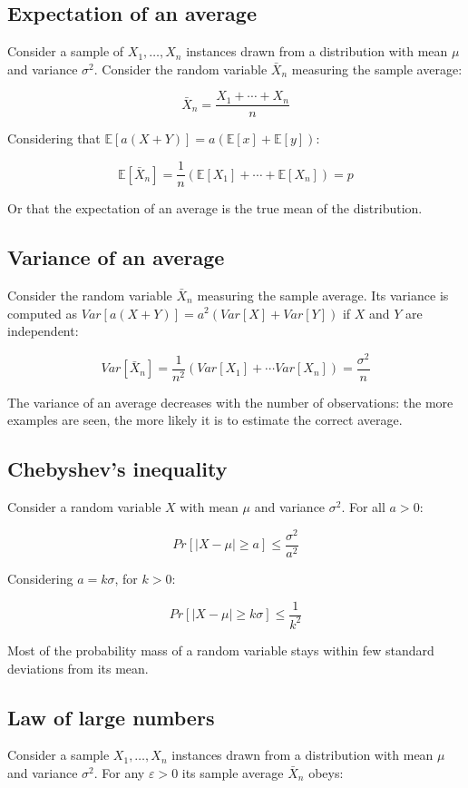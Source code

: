 	\subsection{Expectation of an average}
	Consider a sample of $X_1, \dots, X_n$ instances drawn from a distribution with mean $\mu$ and variance $\sigma^2$.
	Consider the random variable $\bar{X}_n$ measuring the sample average:

	$$\bar{X}_n = \frac{X_1+\cdots+X_n}{n}$$

	Considering that $\mathbb{E}[a(X+Y)] = a(\mathbb{E}[x] + \mathbb{E}[y])$:

	$$\mathbb{E}[\bar{X}_n] = \frac{1}{n}(\mathbb{E}[X_1] + \cdots + \mathbb{E}[X_n]) = p$$

	Or that the expectation of an average is the true mean of the distribution.

	\subsection{Variance of an average}
	Consider the random variable $\bar{X}_n$ measuring the sample average.
	Its variance is computed as $Var[a(X+Y)] = a^2(Var[X] + Var[Y])$ if $X$ and $Y$ are independent:

	$$Var[\bar{X}_n] = \frac{1}{n^2}(Var[X_1] + \cdots Var[X_n]) = \frac{\sigma^2}{n}$$

	The variance of an average decreases with the number of observations: the more examples are seen, the more likely it is to estimate the correct average.

	\subsection{Chebyshev's inequality}
	Consider a random variable $X$ with mean $\mu$ and variance $\sigma^2$.
	For all $a >0$:

	$$Pr[|X-\mu|\ge a] \le \frac{\sigma^2}{a^2}$$

	Considering $a = k\sigma$, for $k > 0$:

	$$Pr[|X-\mu| \ge k\sigma] \le \frac{1}{k^2}$$

	Most of the probability mass of a random variable stays within few standard deviations from its mean.

	\subsection{Law of large numbers}
	Consider a sample $X_1, \dots, X_n$ instances drawn from a distribution with mean $\mu$ and variance $\sigma^2$.
	For any $\varepsilon >0$ its sample average $\bar{X}_n$ obeys:

